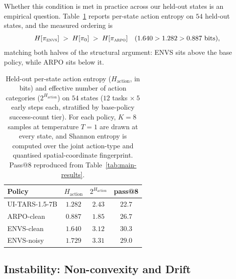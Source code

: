 \documentclass[11pt]{article}
\begin{document}
Whether this condition is met in practice across our held-out states is
an empirical question. Table~\ref{tab:rl:entropy} reports per-state
action entropy on $54$ held-out states, and the measured ordering is
\[
    H[\pi_{\textsc{envs}}] \;>\; H[\pi_0] \;>\; H[\pi_{\textsc{arpo}}]
    \quad (1.640 > 1.282 > 0.887 \text{ bits}),
\]
matching both halves of the structural argument: \textsc{ENVS} sits
above the base policy, while ARPO sits below it.

\begin{table}[H]
  \caption{Held-out per-state action entropy ($H_{\text{action}}$, in
  bits) and effective number of action categories
  ($2^{H_{\text{action}}}$) on $54$ states ($12$ tasks $\times\ 5$ early
  steps each, stratified by base-policy success-count tier). For each
  policy, $K = 8$ samples at temperature $T = 1$ are drawn at every
  state, and Shannon entropy is computed over the joint action-type and
  quantised spatial-coordinate fingerprint. Pass@8 reproduced from
  Table~\ref{tab:main-results}.}
  \label{tab:rl:entropy}
  \centering
  \small
  \begin{tabular}{lccc}
    \toprule
    Policy            & $H_{\text{action}}$ & $2^{H_{\text{action}}}$ & pass@8 \\
    \midrule
    UI-TARS-1.5-7B    & $1.282$ & $2.43$ & $22.7$ \\
    ARPO-clean        & $0.887$ & $1.85$ & $26.7$ \\
    ENVS-clean        & $1.640$ & $3.12$ & $30.3$ \\
    ENVS-noisy        & $1.729$ & $3.31$ & $29.0$ \\
    \bottomrule
  \end{tabular}
\end{table}

\subsection{Instability: Non-convexity and Drift}
\label{app:rl:stability}
\end{document}
